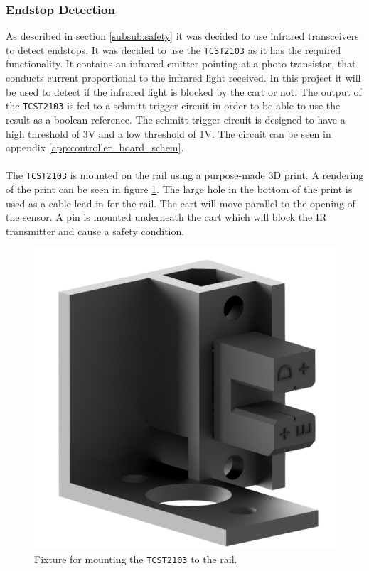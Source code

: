 



\subsubsection{Endstop Detection} %
\label{ssub:endstop_detection}
As described in section \ref{subsub:safety} it was decided to use infrared transceivers to detect endstops.
It was decided to use the \texttt{TCST2103} \cite{tcst2103} as it has the required functionality.
It contains an infrared emitter pointing at a photo transistor, that conducts current proportional to the infrared light received.
In this project it will be used to detect if the infrared light is blocked by the cart or not. 
The output of the \texttt{TCST2103} is fed to a schmitt trigger circuit in order to be able to use the result as a boolean reference.
The schmitt-trigger circuit is designed to have a high threshold of 3V and a low threshold of 1V.
The circuit can be seen in appendix \ref{app:controller_board_schem}.
\\~\\
The \texttt{TCST2103} is mounted on the rail using a purpose-made 3D print.
A rendering of the print can be seen in figure \ref{fig:endstop}.
The large hole in the bottom of the print is used as a cable lead-in for the rail.
The cart will move parallel to the opening of the sensor.
A pin is mounted underneath the cart which will block the IR transmitter and cause a safety condition.

\begin{figure}[h]
	\centering
	\includegraphics[width=.5\linewidth]{graphics/endstop}
	\caption{Fixture for mounting the \texttt{TCST2103} to the rail.}
	\label{fig:endstop}
\end{figure}

